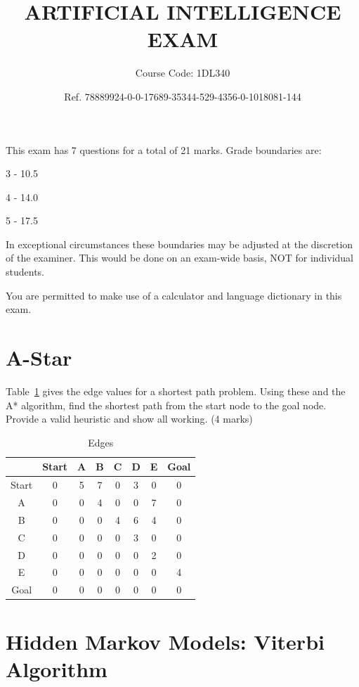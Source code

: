 \documentclass{article}
\begin{document}
 \title{ARTIFICIAL INTELLIGENCE EXAM}
 \author{Course Code: 1DL340}
 \date{Ref.  78889924-0-0-17689-35344-529-4356-0-1018081-144 }
 \maketitle

 This exam has  7  questions for a total of  21  marks. Grade boundaries are:

 \begin{center}
 3 -  10.5 

 4 -  14.0 

 5 -  17.5 

 \end{center}

 In exceptional circumstances these boundaries may be adjusted at the discretion of the examiner. This would be done on an exam-wide basis, NOT for individual students.

 You are permitted to make use of a calculator and language dictionary in this exam.
\clearpage
\section{A-Star}

Table~\ref{AStar_Edges} gives the edge values for a shortest path problem. Using these and the A* algorithm, find the shortest path from the start node to the goal node. Provide a valid heuristic and show all working. (4 marks)

\begin{table}[h!]
\caption{Edges}
\label{AStar_Edges}
\begin{center}
\begin{tabular}{ |c||c|c|c|c|c|c|c| } 
\hline
 & Start & A & B & C & D & E & Goal\\
\hline
Start & 0 & 5 & 7 & 0 & 3 & 0 & 0\\
A & 0 & 0 & 4 & 0 & 0 & 7 & 0\\
B & 0 & 0 & 0 & 4 & 6 & 4 & 0\\
C & 0 & 0 & 0 & 0 & 3 & 0 & 0\\
D & 0 & 0 & 0 & 0 & 0 & 2 & 0\\
E & 0 & 0 & 0 & 0 & 0 & 0 & 4\\
Goal & 0 & 0 & 0 & 0 & 0 & 0 & 0\\
\hline
\end{tabular}
\end{center}
\end{table}
\clearpage
\section{Hidden Markov Models: Viterbi Algorithm}
\end{document}
